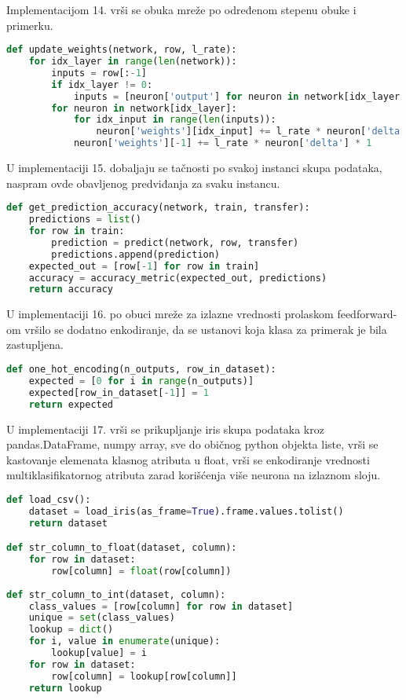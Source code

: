 \documentclass[fontsize=11bp, paper=a4]{scrarticle}
\begin{document}
Implementacijom 14. vrši se obuka mreže po određenom stepenu obuke i primerku.

\begin{lstlisting}[language=Python, caption=\texttt{upadate\_weights}]
def update_weights(network, row, l_rate):
	for idx_layer in range(len(network)):
		inputs = row[:-1]
		if idx_layer != 0:
			inputs = [neuron['output'] for neuron in network[idx_layer - 1]]
		for neuron in network[idx_layer]:
			for idx_input in range(len(inputs)):
				neuron['weights'][idx_input] += l_rate * neuron['delta'] * inputs[idx_input]
			neuron['weights'][-1] += l_rate * neuron['delta'] * 1
\end{lstlisting}

U implementaciji 15. dobaljaju se tačnosti po svakoj instanci skupa podataka, naspram ovde obavljenog predviđanja za svaku instancu.
\begin{lstlisting}[language=Python, caption=\texttt{get\_prediction\_accuracy}]
def get_prediction_accuracy(network, train, transfer):
    predictions = list()
    for row in train:
        prediction = predict(network, row, transfer)
        predictions.append(prediction)
    expected_out = [row[-1] for row in train]
    accuracy = accuracy_metric(expected_out, predictions)
    return accuracy
\end{lstlisting}

U implementaciji 16. po obuci mreže za izlazne vrednosti prolaskom feedforward-om vršilo se dodatno enkodiranje, da se ustanovi koja klasa za primerak je bila zastupljena.

\begin{lstlisting}[language=Python, caption=\texttt{one\_hot\_encoding}]
def one_hot_encoding(n_outputs, row_in_dataset):
    expected = [0 for i in range(n_outputs)]
    expected[row_in_dataset[-1]] = 1
    return expected
\end{lstlisting}

U implementaciji 17. vrši se prikupljanje iris skupa podataka kroz pandas.DataFrame, numpy array, sve do običnog python objekta liste, vrši se kastovanje elemenata klasnog atributa u float, vrši se enkodiranje vrednosti multiklasifikatornog atributa zarad korišćenja više neurona na izlaznom sloju. 
\begin{lstlisting}[language=Python, caption=\texttt{load\_csv, str\_column\_to\_float, str\_column\_to\_int}]
def load_csv():
	dataset = load_iris(as_frame=True).frame.values.tolist()	
	return dataset

def str_column_to_float(dataset, column):
	for row in dataset:
		row[column] = float(row[column])
 
def str_column_to_int(dataset, column):
	class_values = [row[column] for row in dataset]
	unique = set(class_values)
	lookup = dict()
	for i, value in enumerate(unique):
		lookup[value] = i
	for row in dataset:
		row[column] = lookup[row[column]]
	return lookup
\end{lstlisting}
\end{document}
